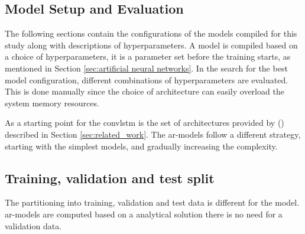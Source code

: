 \subsection{Model Setup and Evaluation}
The following sections contain the configurations of the models compiled for this study along with descriptions of hyperparameters. A model is compiled based on a choice of hyperparameters, it is a parameter set before the training starts, as mentioned in Section \ref{sec:artificial neural networks}. In the search for the best model configuration, different combinations of hyperparameters are evaluated. This is done manually since the choice of architecture can easily overload the system memory resources.
 
As a starting point for the \acrshort{convlstm} is the set of architectures provided by \citeauthor{SunAirLSTM} (\citeyear{SunAirLSTM}) described in Section \ref{sec:related_work}. The \acrshort{ar}-models follow a different strategy, starting with the simplest models, and gradually increasing the complexity. %

\subsection{Training, validation and test split}
The partitioning into training, validation and test data is different for the model. \acrshort{ar}-models are computed based on a analytical solution there is no need for a validation data. 

